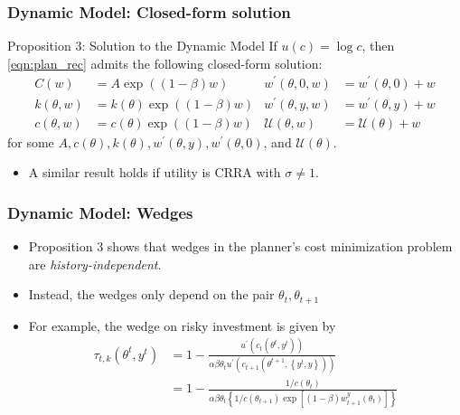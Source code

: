 \documentclass{beamer}
\begin{document}
\begin{frame}
    \frametitle{Dynamic Model: Closed-form solution}

    \begin{block}{Proposition 3: Solution to the Dynamic Model}
        If \( u\left( c \right) = \log c \), then \eqref{eqn:plan_rec} admits the following closed-form solution:
        \begin{align*}
            C(w) &= A\exp\left( \left(1-\beta\right)w \right) &
            w^{\prime}\left(\theta,0,w\right)&=w^{\prime}\left(\theta,0\right)+w \\
            k\left(\theta,w\right)&=k\left(\theta\right)\exp\left(\left(1-\beta\right)w\right) & 
            w^{\prime}\left(\theta,y,w\right)&=w^{\prime}\left(\theta,y\right)+w \\
            c\left(\theta,w\right)&=c\left(\theta\right)\exp\left(\left(1-\beta\right)w\right) &
            \mathcal{U}\left(\theta,w\right)&=\mathcal{U}\left(\theta\right)+w
        \end{align*}
        for some \( A,c\left(\theta\right),k\left(\theta\right),w^{\prime}\left(\theta,y\right),w^{\prime}\left(\theta,0\right) \), and \( \mathcal{U}\left( \theta \right) \). 
    \end{block}
    \begin{itemize}
        \item A similar result holds if utility is CRRA with \( \sigma\ne 1 \).
    \end{itemize}
\end{frame}

\begin{frame}
    \frametitle{Dynamic Model: Wedges}

    \begin{itemize}
        \item Proposition 3 shows that wedges in the planner's cost minimization problem are \textit{history-independent}.
        \item Instead, the wedges only depend on the pair \( \theta_t,\theta_{t+1} \)
        \item For example, the wedge on risky investment is given by 
        \begin{align*}
            \tau_{t,k}\left(\theta^{t},y^{t}\right)&=1-\frac{u^{\prime}\left(c_{t}\left(\theta^{t},y^{t}\right)\right)}{\alpha\beta\theta_{t}u^{\prime}\left(c_{t+1}\left(\theta^{t+1},\left\{ y^{t},y\right\} \right)\right)} \\
            &= 1-\frac{1/c\left(\theta_{t}\right)}{\alpha\beta\theta_{t}\left\{ 1/c\left(\theta_{t+1}\right)\exp\left[\left(1-\beta\right)w_{t+1}^{y}\left(\theta_{t}\right)\right]\right\} }
        \end{align*}
    \end{itemize}

\end{frame}
\end{document}
